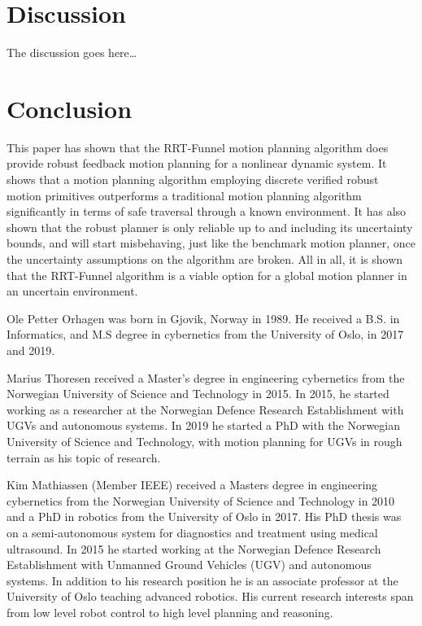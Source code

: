 \documentclass{IEEEtran}
\newcommand{\rrtfunnel}{RRT-Funnel}
\newcommand{\0}{\mathbf{0}}
\newcommand{\1}{\mathbf{1}}
\begin{document}
\section{Discussion}

The discussion goes here\ldots

\section{Conclusion}

This paper has shown that the \rrtfunnel{} motion planning algorithm does
provide robust feedback motion planning for a nonlinear dynamic system. It shows
that a motion planning algorithm employing discrete verified robust motion
primitives outperforms a traditional motion planning algorithm significantly in
terms of safe traversal through a known environment. It has also shown that the
robust planner is only reliable up to and including its uncertainty bounds, and
will start misbehaving, just like the benchmark motion planner, once the
uncertainty assumptions on the algorithm are broken. All in all, it is shown
that the \rrtfunnel{} algorithm is a viable option for a global motion planner
in an uncertain environment.




\begin{IEEEbiographynophoto}{Ole Petter Orhagen}
  was born in Gjovik, Norway in 1989. He received a B.S. in
  Informatics, and M.S degree in cybernetics from the University of Oslo, in
  2017 and 2019.
\end{IEEEbiographynophoto}

\begin{IEEEbiographynophoto}{Marius Thoresen}
  received a Master’s degree in engineering
  cybernetics from the Norwegian University of Science and Technology in 2015.
  In 2015, he started working as a researcher at the Norwegian Defence Research
  Establishment with UGVs and autonomous systems. In 2019 he started a PhD with
  the Norwegian University of Science and Technology, with motion planning for
  UGVs in rough terrain as his topic of research.
\end{IEEEbiographynophoto}

\begin{IEEEbiographynophoto}{Kim Mathiassen}
  (Member IEEE) received a
  Masters degree in engineering cybernetics from
  the Norwegian University of Science and Technology in 2010 and a PhD in robotics from the
  University of Oslo in 2017. His PhD thesis was
  on a semi-autonomous system for diagnostics
  and treatment using medical ultrasound.
  In 2015 he started working at the Norwegian Defence Research Establishment with
  Unmanned Ground Vehicles (UGV) and autonomous systems. In addition to his research
  position he is an associate professor at the University of Oslo teaching
  advanced robotics. His current research interests span from low level
  robot control to high level planning and reasoning.
 \end{IEEEbiographynophoto}
\end{document}
